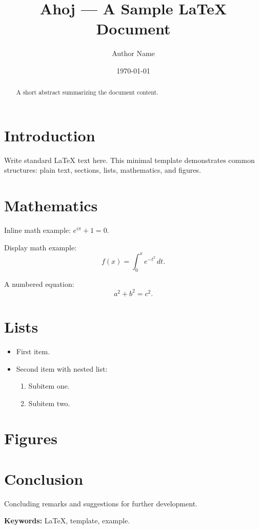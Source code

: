 \documentclass[11pt,a4paper]{article}
\title{Ahoj — A Sample \LaTeX{} Document}
\author{Author Name}
\date{\today}
\begin{document}
\maketitle

\begin{abstract}
A short abstract summarizing the document content.
\end{abstract}

\section{Introduction}
Write standard \LaTeX{} text here. This minimal template demonstrates common structures:
plain text, sections, lists, mathematics, and figures.

\section{Mathematics}
Inline math example: $e^{i\pi} + 1 = 0$.

Display math example:
\[
f(x) = \int_{0}^{x} e^{-t^2}\,dt.
\]

A numbered equation:
\begin{equation}
\label{eq:sample}
a^2 + b^2 = c^2.
\end{equation}

\section{Lists}
\begin{itemize}
    \item First item.
    \item Second item with nested list:
        \begin{enumerate}
            \item Subitem one.
            \item Subitem two.
        \end{enumerate}
\end{itemize}

\section{Figures}

\section{Conclusion}
Concluding remarks and suggestions for further development.

\bigskip
\noindent\textbf{Keywords:} \LaTeX{}, template, example.
\end{document}
